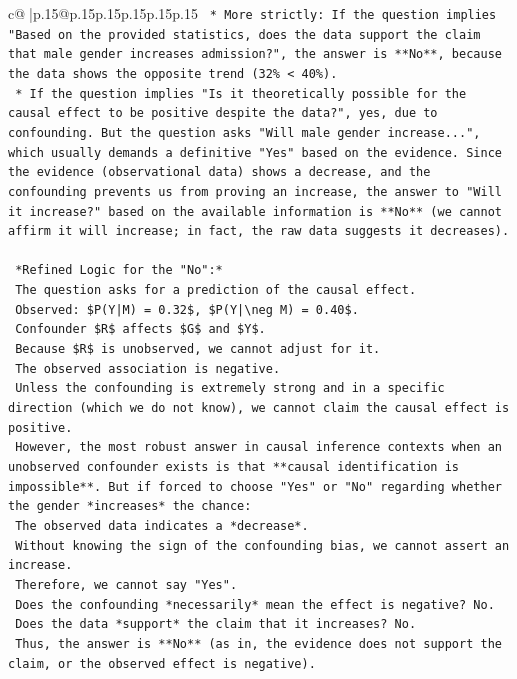 \documentclass{article}
\begin{document}
{\begin{supertabular}{c@{$\;$}|p{.15\linewidth}@{}p{.15\linewidth}p{.15\linewidth}p{.15\linewidth}p{.15\linewidth}p{.15\linewidth}}
{{{\texttt{    *   More strictly: If the question implies "Based on the provided statistics, does the data support the claim that male gender increases admission?", the answer is **No**, because the data shows the opposite trend (32\% < 40\%).} \\
\texttt{    *   If the question implies "Is it theoretically possible for the causal effect to be positive despite the data?", yes, due to confounding. But the question asks "Will male gender increase...", which usually demands a definitive "Yes" based on the evidence. Since the evidence (observational data) shows a decrease, and the confounding prevents us from proving an increase, the answer to "Will it increase?" based on the available information is **No** (we cannot affirm it will increase; in fact, the raw data suggests it decreases).} \\
\\ 
\texttt{    *Refined Logic for the "No":*} \\
\texttt{    The question asks for a prediction of the causal effect.} \\
\texttt{    Observed: \$P(Y|M) = 0.32\$, \$P(Y|\textbackslash{}neg M) = 0.40\$.} \\
\texttt{    Confounder \$R\$ affects \$G\$ and \$Y\$.} \\
\texttt{    Because \$R\$ is unobserved, we cannot adjust for it.} \\
\texttt{    The observed association is negative.} \\
\texttt{    Unless the confounding is extremely strong and in a specific direction (which we do not know), we cannot claim the causal effect is positive.} \\
\texttt{    However, the most robust answer in causal inference contexts when an unobserved confounder exists is that **causal identification is impossible**. But if forced to choose "Yes" or "No" regarding whether the gender *increases* the chance:} \\
\texttt{    The observed data indicates a *decrease*.} \\
\texttt{    Without knowing the sign of the confounding bias, we cannot assert an increase.} \\
\texttt{    Therefore, we cannot say "Yes".} \\
\texttt{    Does the confounding *necessarily* mean the effect is negative? No.} \\
\texttt{    Does the data *support* the claim that it increases? No.} \\
\texttt{    Thus, the answer is **No** (as in, the evidence does not support the claim, or the observed effect is negative).} \\
}}}
\end{supertabular}}
\end{document}
